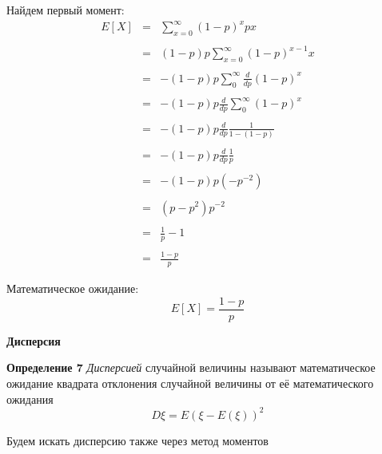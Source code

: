 \documentclass[a4paper,12pt, oneside]{book}
\begin{document}
{\vspace{\baselineskip}
Найдем первый момент:
$$
\begin{array}{rcl}
E[X] &=& \sum\limits_{x=0}^{\infty} (1-p)^x px \\
\\
&=&(1-p)p \sum\limits_{x=0}^{\infty} (1-p)^{x-1} x\\
\\
&=&-(1-p)p \sum\limits_{0}^{\infty} \frac{d}{dp} (1-p)^x\\
\\
&=&-(1-p)p \frac{d}{dp} \sum\limits_{0}^{\infty} (1-p)^x\\
\\
&=&-(1-p)p\frac{d}{dp} \frac{1}{1-(1-p)}\\
\\
&=&-(1-p)p\frac{d}{dp} \frac{1}{p}\\
\\
&=&-(1-p)p(-p^{-2})\\
\\
&=&(p-p^2)p^{-2}\\
\\
&=&\frac{1}{p} - 1\\
\\
&=& \frac{1-p}{p}
\end{array}
$$

Математическое ожидание:
$$
E[X] = \frac{1-p}{p}
$$



\vspace{5mm}
\large{\textbf{Дисперсия}}
\vspace{5mm}

\normalsize{\textbf{Определение 7}} \textit{ Дисперсией } случайной величины называют математическое ожидание квадрата отклонения случайной величины от её математического ожидания
$$
D\xi = E(\xi - E(\xi))^2
$$

Будем искать дисперсию также через метод моментов

}
\end{document}
